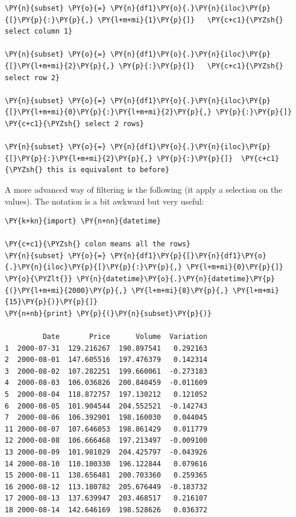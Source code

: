 \begin{tcolorbox}[breakable, size=fbox, boxrule=1pt, pad at break*=1mm,colback=cellbackground, colframe=cellborder]
\begin{Verbatim}[commandchars=\\\{\}]
\PY{n}{subset} \PY{o}{=} \PY{n}{df1}\PY{o}{.}\PY{n}{iloc}\PY{p}{[}\PY{p}{:}\PY{p}{,} \PY{l+m+mi}{1}\PY{p}{]}   \PY{c+c1}{\PYZsh{} select column 1}

\PY{n}{subset} \PY{o}{=} \PY{n}{df1}\PY{o}{.}\PY{n}{iloc}\PY{p}{[}\PY{l+m+mi}{2}\PY{p}{,} \PY{p}{:}\PY{p}{]}   \PY{c+c1}{\PYZsh{} select row 2}

\PY{n}{subset} \PY{o}{=} \PY{n}{df1}\PY{o}{.}\PY{n}{iloc}\PY{p}{[}\PY{l+m+mi}{0}\PY{p}{:}\PY{l+m+mi}{2}\PY{p}{,} \PY{p}{:}\PY{p}{]} \PY{c+c1}{\PYZsh{} select 2 rows}

\PY{n}{subset} \PY{o}{=} \PY{n}{df1}\PY{o}{.}\PY{n}{iloc}\PY{p}{[}\PY{p}{:}\PY{l+m+mi}{2}\PY{p}{,} \PY{p}{:}\PY{p}{]}  \PY{c+c1}{\PYZsh{} this is equivalent to before}
\end{Verbatim}
\end{tcolorbox}

A more advanced way of filtering is the following (it apply a selection on the values). The notation is a bit awkward but very useful:

\begin{tcolorbox}[breakable, size=fbox, boxrule=1pt, pad at break*=1mm,colback=cellbackground, colframe=cellborder]
\begin{Verbatim}[commandchars=\\\{\}]
\PY{k+kn}{import} \PY{n+nn}{datetime}

\PY{c+c1}{\PYZsh{} colon means all the rows}
\PY{n}{subset} \PY{o}{=} \PY{n}{df1}\PY{p}{[}\PY{n}{df1}\PY{o}{.}\PY{n}{iloc}\PY{p}{[}\PY{p}{:}\PY{p}{,} \PY{l+m+mi}{0}\PY{p}{]} \PY{o}{\PYZlt{}} \PY{n}{datetime}\PY{o}{.}\PY{n}{datetime}\PY{p}{(}\PY{l+m+mi}{2000}\PY{p}{,} \PY{l+m+mi}{8}\PY{p}{,} \PY{l+m+mi}{15}\PY{p}{)}\PY{p}{]}
\PY{n+nb}{print} \PY{p}{(}\PY{n}{subset}\PY{p}{)}

         Date       Price      Volume  Variation
1  2000-07-31  129.216267  190.897541   0.292163
2  2000-08-01  147.605516  197.476379   0.142314
3  2000-08-02  107.282251  199.660061  -0.273183
4  2000-08-03  106.036826  200.840459  -0.011609
5  2000-08-04  118.872757  197.130212   0.121052
6  2000-08-05  101.904544  204.552521  -0.142743
7  2000-08-06  106.392901  198.160030   0.044045
11 2000-08-07  107.646053  198.861429   0.011779
12 2000-08-08  106.666468  197.213497  -0.009100
13 2000-08-09  101.981029  204.425797  -0.043926
14 2000-08-10  110.100330  196.122844   0.079616
15 2000-08-11  138.656481  200.703360   0.259365
16 2000-08-12  113.180782  205.676449  -0.183732
17 2000-08-13  137.639947  203.468517   0.216107
18 2000-08-14  142.646169  198.528626   0.036372
\end{Verbatim}
\end{tcolorbox}

